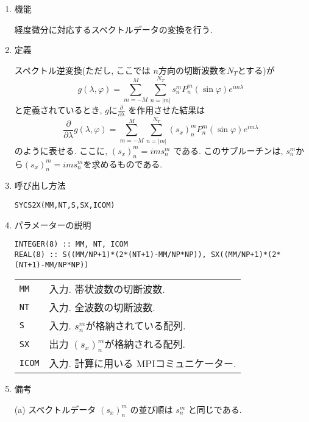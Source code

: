 \documentclass[a4j]{jsarticle}
\begin{document}
\begin{enumerate}

\item 機能 

経度微分に対応するスペクトルデータの変換を行う.

\item 定義

スペクトル逆変換(ただし, ここでは $n$方向の切断波数を$N_T$とする)が
\begin{equation}
g(\lambda,\varphi)=\sum^M_{m=-M}\sum^{N_T}_{n=|m|}
s^m_nP^m_n(\sin\varphi)e^{im\lambda}
\end{equation}
と定義されているとき, $g$に$\frac{\partial}{\partial\lambda}$
を作用させた結果は
\begin{equation}
\frac{\partial}{\partial\lambda}
g(\lambda,\varphi)=\sum^M_{m=-M}\sum^{N_T}_{n=|m|}
(s_x)^m_nP^m_n(\sin\varphi)e^{im\lambda}
\end{equation}
のように表せる. ここに, $(s_x)^m_n=ims^m_n$ である.
このサブルーチンは, $s^m_n$から$(s_x)^m_n=ims^m_n$を求めるものである.

\item 呼び出し方法 

\texttt{SYCS2X(MM,NT,S,SX,ICOM)}
  
\item パラメーターの説明

\begin{verbatim}
INTEGER(8) :: MM, NT, ICOM
REAL(8) :: S((MM/NP+1)*(2*(NT+1)-MM/NP*NP)), SX((MM/NP+1)*(2*(NT+1)-MM/NP*NP))
\end{verbatim}

\begin{tabular}{ll}
\texttt{MM} & 入力. 帯状波数の切断波数.\\  
\texttt{NT} & 入力. 全波数の切断波数.\\
\texttt{S} & 入力. $s^m_n$が格納されている配列.\\
\texttt{SX} & 出力 $(s_x)^m_n$が格納される配列.\\
\texttt{ICOM} & 入力. 計算に用いる MPIコミュニケーター.
\end{tabular}

\item 備考

(a) スペクトルデータ $(s_x)^m_n$ の並び順は $s^m_n$ と同じである.
    
\end{enumerate}

\end{document}
